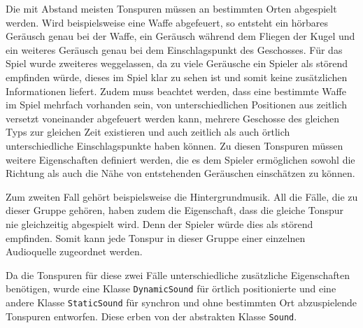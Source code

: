 Die mit Abstand meisten Tonspuren müssen an bestimmten Orten abgespielt werden. Wird beispielsweise eine Waffe abgefeuert, so entsteht ein hörbares Geräusch genau bei der Waffe, ein Geräusch während dem Fliegen der Kugel und ein weiteres Geräusch genau bei dem Einschlagspunkt des Geschosses. Für das Spiel wurde zweiteres weggelassen, da zu viele Geräusche ein Spieler als störend empfinden würde, dieses im Spiel klar zu sehen ist und somit keine zusätzlichen Informationen liefert. Zudem muss beachtet werden, dass eine bestimmte Waffe im Spiel mehrfach vorhanden sein, von unterschiedlichen Positionen aus zeitlich versetzt voneinander abgefeuert werden kann, mehrere Geschosse des gleichen Typs zur gleichen Zeit existieren und auch zeitlich als auch örtlich unterschiedliche Einschlagspunkte haben können. Zu diesen Tonspuren müssen weitere Eigenschaften definiert werden, die es dem Spieler ermöglichen sowohl die Richtung als auch die Nähe von entstehenden Geräuschen einschätzen zu können.

Zum zweiten Fall gehört beispielsweise die Hintergrundmusik. All die Fälle, die zu dieser Gruppe gehören, haben zudem die Eigenschaft, dass die gleiche Tonspur nie gleichzeitig abgespielt wird. Denn der Spieler würde dies als störend empfinden. Somit kann jede Tonspur in dieser Gruppe einer einzelnen Audioquelle zugeordnet werden.

Da die Tonspuren für diese zwei Fälle unterschiedliche zusätzliche Eigenschaften benötigen, wurde eine Klasse \texttt{DynamicSound} für örtlich positionierte und eine andere Klasse \texttt{StaticSound} für synchron und ohne bestimmten Ort abzuspielende Tonspuren entworfen. Diese erben von der abstrakten Klasse \texttt{Sound}. 

